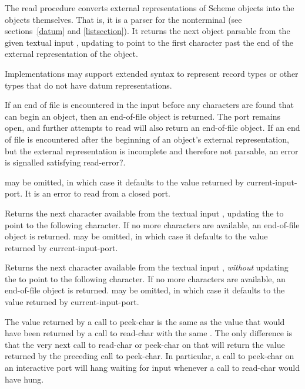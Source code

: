 \begin{entry}{%
}

The {\cf read} procedure converts external representations of Scheme objects into the
objects themselves.  That is, it is a parser for the nonterminal
 (see sections~\ref{datum} and
\ref{listsection}).  It returns the next
object parsable from the given textual input , updating
 to point to
the first character past the end of the external representation of the object.

Implementations may support extended syntax to represent record types or
other types that do not have datum representations.

\vest If an end of file is encountered in the input before any
characters are found that can begin an object, then an end-of-file
object is returned.  The port remains open, and further attempts
to read will also return an end-of-file object.  If an end of file is
encountered after the beginning of an object's external representation,
but the external representation is incomplete and therefore not parsable,
an error is signalled satisfying {\cf read-error?}.

 may be omitted, in which case it defaults to the
value returned by {\cf current-input-port}.  It is an error to read from
a closed port.
\end{entry}

\begin{entry}{%
}

Returns the next character available from the textual input ,
updating
the  to point to the following character.  If no more characters
are available, an end-of-file object is returned.   may be
omitted, in which case it defaults to the value returned by {\cf current-input-port}.

\end{entry}


\begin{entry}{%
}

Returns the next character available from the textual input ,
{\em without} updating
the  to point to the following character.  If no more characters
are available, an end-of-file object is returned.   may be
omitted, in which case it defaults to the value returned by {\cf current-input-port}.

\begin{note}
The value returned by a call to {\cf peek-char} is the same as the
value that would have been returned by a call to {\cf read-char} with the
same .  The only difference is that the very next call to
{\cf read-char} or {\cf peek-char} on that  will return the
value returned by the preceding call to {\cf peek-char}.  In particular, a call
to {\cf peek-char} on an interactive port will hang waiting for input
whenever a call to {\cf read-char} would have hung.
\end{note}

\end{entry}


